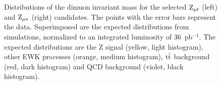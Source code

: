 \begin{figure}[hbtp]
\begin{minipage}{73mm}
\begin{center}
      \end{center}
    \end{minipage}
\caption{Distributions of the dimuon invariant mass for the selected
$\mathrm{Z}_{\mu t}$ (left) and $\mathrm{Z}_{\mu s}$ (right) candidates.
The points with the error bars represent the data.
Superimposed are the expected distributions from simulations, normalized
to an integrated luminosity of $36$~pb$^{-1}$. The expected distributions are
the Z signal (yellow, light histogram), other EWK processes (orange, medium histogram),
$\mathrm{t}\bar{\mathrm{t}}$ background (red, dark histogram) and QCD background (violet, black histogram).
}
\label{fig:zNoGold1}
\end{figure}
